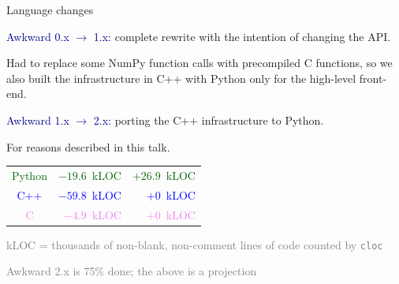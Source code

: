 \documentclass[aspectratio=169]{beamer}
\begin{document}
\begin{frame}{Language changes}
\large
\vspace{0.5 cm}

\textcolor{darkblue}{Awkward 0.x $\to$ 1.x:} complete rewrite with the intention of changing the API.

\vspace{0.25 cm}
Had to replace some NumPy function calls with precompiled C functions, so we also built the infrastructure in C++ with Python only for the high-level front-end.

\vspace{1 cm}

\textcolor{darkblue}{Awkward 1.x $\to$ 2.x:} porting the C++ infrastructure to Python.

\vspace{0.25 cm}
For reasons described in this talk.

\vspace{0.25 cm}
\begin{center}
\begin{tabular}{c r r}
\textcolor{darkgreen}{Python} & \textcolor{darkgreen}{$-19.6$~kLOC} & \textcolor{darkgreen}{$+26.9$~kLOC} \\
\textcolor{blue}{C++} & \textcolor{blue}{$-59.8$~kLOC} & \textcolor{blue}{$+0$~kLOC} \\
\textcolor{violet}{C} & \textcolor{violet}{$-4.9$~kLOC} & \textcolor{violet}{$+0$~kLOC} \\
\end{tabular}

\vspace{0.25 cm}
\textcolor{gray}{\scriptsize kLOC = thousands of non-blank, non-comment lines of code counted by \texttt{cloc}}

\textcolor{gray}{\scriptsize Awkward 2.x is 75\% done; the above is a projection}
\end{center}
\end{frame}
\end{document}
